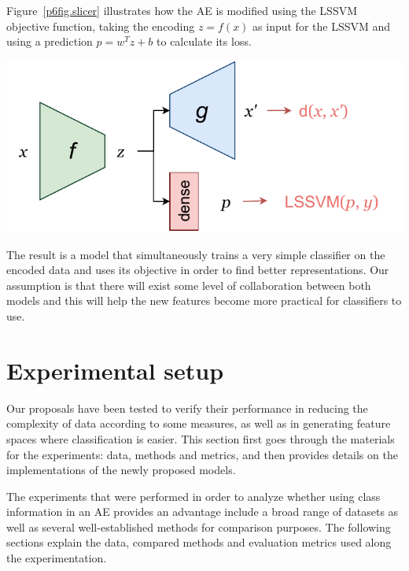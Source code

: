 
Figure~\ref{p6fig.slicer} illustrates how the AE is modified using the LSSVM objective function, taking the encoding $z=f(x)$ as input for the LSSVM and using a prediction $p=w^Tz+b$ to calculate its loss.

\begin{marginfigure}
  \centering
  \includegraphics[width=\linewidth]{slicer.pdf}
  \caption{\label{p6fig.slicer}}
\end{marginfigure}

The result is a model that simultaneously trains a very simple classifier on the encoded data and uses its objective in order to find better representations. Our assumption is that there will exist some level of collaboration between both models and this will help the new features become more practical for classifiers to use.

\section{Experimental setup}\label{p6sec.setup}

Our proposals have been tested to verify their performance in reducing the complexity of data according to some measures, as well as in generating feature spaces where  classification is easier. This section first goes through the materials for the experiments: data, methods and metrics, and then provides details on the implementations of the newly proposed models.

The experiments that were performed in order to analyze whether using class information in an AE provides an advantage include a broad range of datasets as well as several well-established methods for comparison purposes. The following sections explain the data, compared methods and evaluation metrics used along the experimentation.

